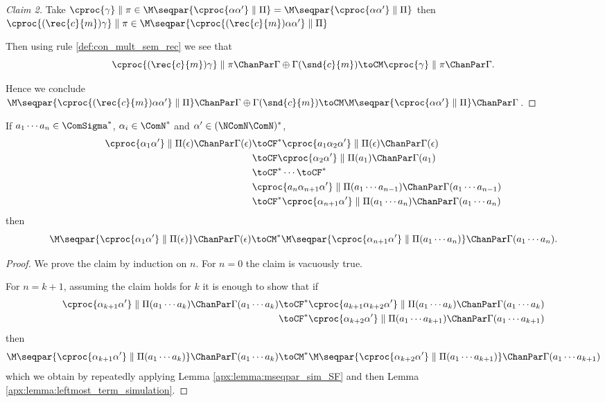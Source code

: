 \begin{proof}[Claim 2]
	Take $\cproc{\gamma} \parallel \pi \in \M\seqpar{\cproc{\alpha\alpha'} \parallel \Pi} = \M\seqpar{\cproc{\alpha\alpha'} \parallel \Pi}$
	then $\cproc{(\rec{c}{m})\gamma} \parallel \pi \in \M\seqpar{\cproc{(\rec{c}{m})\alpha\alpha'} \parallel \Pi}$

	Then using rule \ref{def:con_mult_sem_rec} we see that 
	$${\cproc{(\rec{c}{m})\gamma} \parallel \pi \ChanPar \Gamma \oplus \Gamma(\snd{c}{m}) \toCM 
	\cproc{\gamma} \parallel \pi \ChanPar \Gamma}.$$ 
	
	Hence we conclude 
	${\M\seqpar{\cproc{(\rec{c}{m})\alpha\alpha'} \parallel \Pi} \ChanPar \Gamma \oplus \Gamma(\snd{c}{m}) \toCM 
	     \M\seqpar{\cproc{\alpha\alpha'} \parallel \Pi} \ChanPar \Gamma}$.
\end{proof}
\pagebreak
\begin{lemma}\label{apx:lemma:leftmost_term_simulation_with_comsideeffects}
	\item If $a_1 \cdots a_n \in \ComSigma^*$, $\alpha_i \in \ComN^*$ and $\alpha' \in (\NComN \ComN)^*$, 
			\begin{align*}
			 \cproc{\alpha_1\alpha'} \parallel \Pi(\epsilon) \ChanPar \Gamma(\epsilon) &\toCF^*  
			 \cproc{a_1\alpha_2\alpha'} \parallel \Pi(\epsilon) \ChanPar \Gamma(\epsilon) \\
			 & \toCF \cproc{\alpha_2\alpha'} \parallel \Pi(a_1) \ChanPar \Gamma(a_1) \\
			 & \toCF^* \cdots \toCF^* \\
			 & \cproc{a_n\alpha_{n+1}\alpha'} \parallel \Pi(a_1\cdots a_{n-1}) \ChanPar \Gamma(a_1\cdots a_{n-1}) \\
			 & \toCF^* \cproc{\alpha_{n+1}\alpha'} \parallel \Pi(a_1\cdots a_{n}) \ChanPar \Gamma(a_1\cdots a_{n})
			\end{align*}  
			then 
			$$\M\seqpar{\cproc{\alpha_1\alpha'} \parallel \Pi(\epsilon)} \ChanPar \Gamma(\epsilon) \toCM^* 
			\M\seqpar{\cproc{\alpha_{n+1}\alpha'}  \parallel \Pi(a_1\cdots a_{n})} \ChanPar \Gamma(a_1\cdots a_{n}).$$
\end{lemma}
\begin{proof}
We prove the claim by induction on $n$.
For $n = 0$ the claim is vacuously true.

For $n = k + 1$, assuming the claim holds for $k$ it is enough to show that if
\begin{align*}
\cproc{\alpha_{k+1}\alpha'} \parallel \Pi(a_1\cdots a_{k}) \ChanPar \Gamma(a_1\cdots a_{k}) &\toCF^*
\cproc{a_{k+1}\alpha_{k+2}\alpha'} \parallel \Pi(a_1\cdots a_{k}) \ChanPar \Gamma(a_1\cdots a_{k})\\ 
&\toCF^* \cproc{\alpha_{k+2}\alpha'} \parallel \Pi(a_1\cdots a_{k+1}) \ChanPar \Gamma(a_1\cdots a_{k+1})
\end{align*}
then 
$$\M\seqpar{\cproc{\alpha_{k+1}\alpha'} \parallel \Pi(a_1\cdots a_{k})} \ChanPar \Gamma(a_1\cdots a_{k}) 
\toCM^*
\M\seqpar{\cproc{\alpha_{k+2}\alpha'}  \parallel \Pi(a_1\cdots a_{k+1})} \ChanPar \Gamma(a_1\cdots a_{k+1})$$
which we obtain by repeatedly applying Lemma \ref{apx:lemma:mseqpar_sim_SF} and then Lemma \ref{apx:lemma:leftmost_term_simulation}.
\end{proof}

